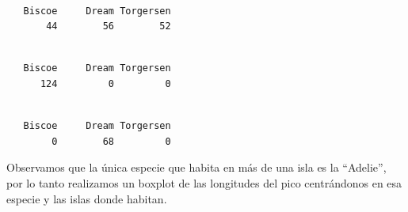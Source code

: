 \documentclass[
  letterpaper,
  DIV=11,
  numbers=noendperiod]{scrartcl}
\newenvironment{Shaded}{\begin{snugshade}}{\end{snugshade}}
\newcommand{\AttributeTok}[1]{\textcolor[rgb]{0.40,0.45,0.13}{#1}}
\newcommand{\FunctionTok}[1]{\textcolor[rgb]{0.28,0.35,0.67}{#1}}
\newcommand{\NormalTok}[1]{\textcolor[rgb]{0.00,0.23,0.31}{#1}}
\newcommand{\SpecialCharTok}[1]{\textcolor[rgb]{0.37,0.37,0.37}{#1}}
\newcommand{\StringTok}[1]{\textcolor[rgb]{0.13,0.47,0.30}{#1}}
\begin{document}
\begin{verbatim}

   Biscoe     Dream Torgersen 
       44        56        52 
\end{verbatim}

\begin{Shaded}
\end{Shaded}

\begin{verbatim}

   Biscoe     Dream Torgersen 
      124         0         0 
\end{verbatim}

\begin{Shaded}
\end{Shaded}

\begin{verbatim}

   Biscoe     Dream Torgersen 
        0        68         0 
\end{verbatim}

Observamos que la única especie que habita en más de una isla es la
``Adelie'', por lo tanto realizamos un boxplot de las longitudes del
pico centrándonos en esa especie y las islas donde habitan.

\begin{Shaded}
\end{Shaded}
\end{document}
